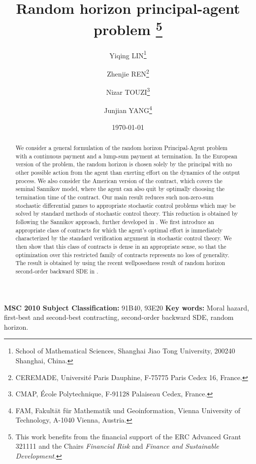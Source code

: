 \documentclass[11pt,a4paper]{article}
\numberwithin{equation}{section}
\theoremstyle{definition}
\begin{document}
\title{Random horizon principal-agent problem
        \thanks{
        This work benefits from the financial support of the ERC Advanced Grant 321111 and the Chairs {\it Financial Risk} and {\it Finance and Sustainable Development}.
       }}

\author{Yiqing LIN\footnote{School of Mathematical Sciences, Shanghai Jiao Tong University, 200240 Shanghai, China.}
        \and Zhenjie REN\footnote{CEREMADE, Universit\'e Paris Dauphine, F-75775 Paris Cedex 16, France. }
        \and Nizar TOUZI\footnote{CMAP, \'Ecole Polytechnique, F-91128 Palaiseau Cedex, France.}
        \and Junjian YANG\footnote{FAM, Fakult\"at f\"ur Mathematik und Geoinformation, Vienna University of Technology, A-1040 Vienna, Austria.}
       }

\date{\today}

\maketitle


\begin{abstract} 
 We consider a general formulation of the random horizon Principal-Agent problem with a continuous payment and a lump-sum payment at termination. 
 In the European version of the problem, the random horizon is chosen solely by the principal with no other possible action from the agent than exerting effort on the dynamics of the output process. 
 We also consider the American version of the contract, which covers the seminal Sannikov \cite{Sannikov08} model, where the agent can also quit by optimally choosing the termination time of the contract. 
 Our main result reduces such non-zero-sum stochastic differential games to appropriate stochastic control problems which may be solved by standard methods of stochastic control theory. 
 This reduction is obtained by following the Sannikov \cite{Sannikov08} approach, further developed in \cite{CPT18}. 
 We first introduce an appropriate class of contracts for which the agent's optimal effort is immediately characterized by the standard verification argument in stochastic control theory. 
 We then show that this class of contracts is dense in an appropriate sense, so that the optimization over this restricted family of contracts represents no loss of generality. 
 The result is obtained by using the recent wellposedness result of random horizon second-order backward SDE in \cite{LRTY18}.
\end{abstract}

\noindent
\textbf{MSC 2010 Subject Classification:} 91B40, 93E20 \newline
\vspace{-0.2cm}\newline
\noindent
\noindent
\textbf{Key words:} Moral hazard, first-best and second-best contracting, second-order backward SDE, random horizon.  
\end{document}
